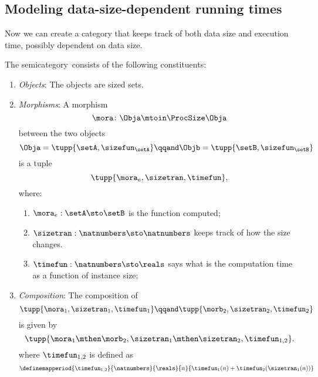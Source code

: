 \subsection{Modeling data-size-dependent running times}

Now we can create a category that keeps track of both data size and execution time, possibly dependent on data size.
\begin{definition}
    \label{def:ProcSizeTime}
    The semicategory~\ProcSizeTime consists of the following constituents:
    \begin{enumerate}
        \item \emph{Objects}: The objects are sized sets.
        \item \emph{Morphisms}: A morphism
        \begin{equation}
            \mora \colon \Obja \mtoin\ProcSize \Obja
        \end{equation}
        between the two objects
        \begin{equation}
            \Obja = \tupp{\setA, \sizefun_{\setA}}
            \qqand
            \Objb = \tupp{\setB, \sizefun_{\setB}}
        \end{equation}
        is a tuple
        \begin{equation}
            \tupp{\mora_e, \sizetran, \timefun },
        \end{equation}
        where:
        \begin{enumerate}
            \item $\mora_e : \setA \sto \setB$ is the function computed;
            \item $\sizetran: \natnumbers \sto \natnumbers$ keeps track of how the size changes.
            \item $\timefun: \natnumbers \sto \reals$ says what is the computation time as a function of instance size;
        \end{enumerate}

        \item \emph{Composition}: The composition of
        \begin{equation}
            \tupp{\mora_1, \sizetran_1,  \timefun_1  }
            \qqand
            \tupp{\morb_2, \sizetran_2,  \timefun_2  }
        \end{equation}
        is given by
        \begin{equation}
            \tupp{
                \mora_1 \mthen \morb_2,
                \sizetran_1 \mthen \sizetran_2,
                \timefun_{1,2}
            }.
        \end{equation}
        where $\timefun_{1,2}$ is defined as
        \begin{equation}\label{eq:timefun-composition}
            \definemapperiod{
                \timefun_{1,2}
            }{
                \natnumbers
            }{
                \reals
            }{
                n
            }{
                \timefun_1(n) + \timefun_2(\sizetran_1(n))
            }
        \end{equation}
    \end{enumerate}
\end{definition}


